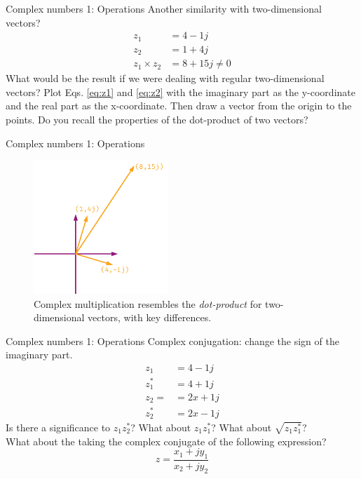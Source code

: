 \documentclass{beamer}
\begin{document}
\begin{frame}{Complex numbers 1: Operations}
Another similarity with two-dimensional vectors?
\begin{align}
z_1 &= 4-1j \label{eq:z1} \\
z_2 &= 1+4j \label{eq:z2} \\
z_1 \times z_2 &= 8 + 15j \neq 0
\end{align}
What would be the result if we were dealing with regular two-dimensional vectors?  Plot Eqs. \ref{eq:z1} and \ref{eq:z2} with the imaginary part as the y-coordinate and the real part as the x-coordinate.  Then draw a vector from the origin to the points.  Do you recall the properties of the \alert{dot-product} of two vectors?
\end{frame}

\begin{frame}{Complex numbers 1: Operations}
\begin{figure}
\centering
\includegraphics[width=0.45\textwidth]{figures/complexNumbers3.pdf}
\caption{\label{fig:complex2} Complex multiplication resembles the \textit{dot-product} for two-dimensional vectors, with key differences.}
\end{figure}
\end{frame}

\begin{frame}{Complex numbers 1: Operations}
Complex conjugation: change the sign of the imaginary part.
\begin{align}
z_1 &= 4-1j \\
z_1^* &= 4+1j \\
z_2 = &= 2x + 1j \\
z_2^* &= 2x - 1j
\end{align}
Is there a significance to $z_1 z_2^*$?  What about $z_1 z_1^*$?  What about $\sqrt{z_1 z_1^*}$? \\ \vspace{0.5cm}
What about the taking the complex conjugate of the following expression?
\begin{equation}
z = \frac{x_1 + jy_1}{x_2 + j y_2}
\end{equation}
\end{frame}
\end{document}
